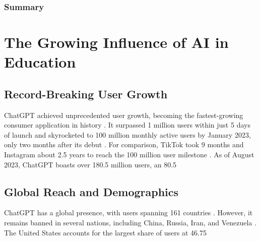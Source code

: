 \documentclass{article}
\begin{document}
\subsubsection{Summary}%


\newpage
\section{The Growing Influence of AI in Education}
\subsection{Record-Breaking User Growth}
ChatGPT achieved unprecedented user growth, becoming the fastest-growing consumer application in history \cite{https://arstechnica.com/information-technology/2023/02/chatgpt-sets-record-for-fastest-growing-user-base-in-history-report-says/}. It surpassed 1 million users within just 5 days of launch and skyrocketed to 100 million monthly active users by January 2023, only two months after its debut \cite{https://meetanshi.com/blog/chatgpt-statistics/} \cite{https://nerdynav.com/chatgpt-statistics/} \cite{https://www.namepepper.com/chatgpt-users}. For comparison, TikTok took 9 months and Instagram about 2.5 years to reach the 100 million user milestone \cite{https://arstechnica.com/information-technology/2023/02/chatgpt-sets-record-for-fastest-growing-user-base-in-history-report-says/}.
As of August 2023, ChatGPT boasts over 180.5 million users, an 80.5%
\subsection{Global Reach and Demographics}
ChatGPT has a global presence, with users spanning 161 countries \cite{https://meetanshi.com/blog/chatgpt-statistics/}. However, it remains banned in several nations, including China, Russia, Iran, and Venezuela \cite{https://meetanshi.com/blog/chatgpt-statistics/} \cite{https://nerdynav.com/chatgpt-statistics/}.
The United States accounts for the largest share of users at 46.75%
\end{document}
